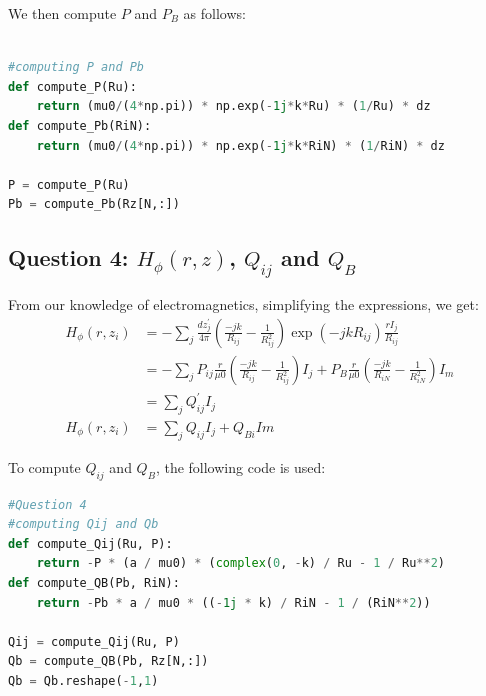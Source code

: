 \documentclass[11pt, a4paper]{article}
\begin{document}
We then compute $P$ and $P_B$ as follows:\\

\begin{lstlisting}[language = Python]

#computing P and Pb
def compute_P(Ru):
    return (mu0/(4*np.pi)) * np.exp(-1j*k*Ru) * (1/Ru) * dz
def compute_Pb(RiN):
    return (mu0/(4*np.pi)) * np.exp(-1j*k*RiN) * (1/RiN) * dz

P = compute_P(Ru)
Pb = compute_Pb(Rz[N,:])


\end{lstlisting}

\subsection{Question 4: $H_\phi(r,z)$, $Q_{ij}$ and $Q_B$}
From our knowledge of electromagnetics, simplifying the expressions, we get:
\begin{align*}
    H_\phi(r, z_i) & = -\sum_{j} \frac{dz^{'}_j}{4\pi}(\frac{-jk}{R_{ij}}-\frac{1}{R^2_{ij}})\exp(-jkR_{ij})\frac{rI_j}{R_{ij}}                                \\
                   & = -\sum_{j}P_{ij}\frac{r}{\mu0}(\frac{-jk}{R_{ij}}-\frac{1}{R^2_{ij}})I_j + P_{B}\frac{r}{\mu0}(\frac{-jk}{R_{iN}}-\frac{1}{R^2_{iN}})I_m \\
                   & = \sum_{j}Q^{'}_{ij}I_j                                                                                                                   \\
H_\phi(r, z_i)                   & = \sum_{j}Q_{ij}I_{j} + Q_{Bi}Im
\end{align*}

To compute $Q_{ij}$ and $Q_B$, the following code is used:\\

\begin{lstlisting}[language = Python]
#Question 4
#computing Qij and Qb
def compute_Qij(Ru, P):
    return -P * (a / mu0) * (complex(0, -k) / Ru - 1 / Ru**2)
def compute_QB(Pb, RiN):
    return -Pb * a / mu0 * ((-1j * k) / RiN - 1 / (RiN**2))

Qij = compute_Qij(Ru, P)
Qb = compute_QB(Pb, Rz[N,:])
Qb = Qb.reshape(-1,1)
\end{lstlisting}
\end{document}
